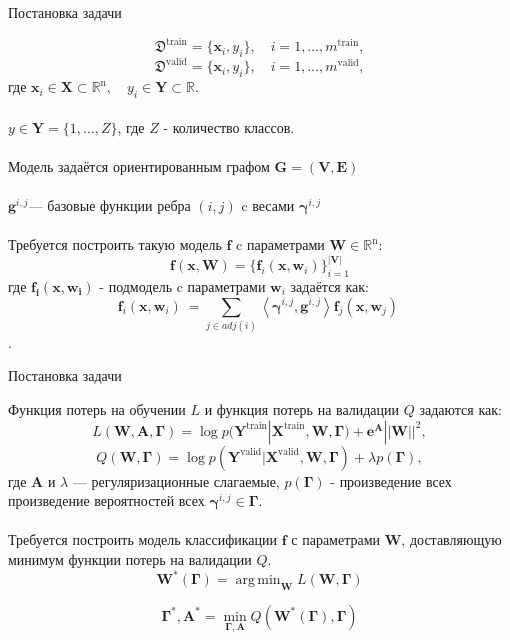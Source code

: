 \documentclass[10pt]{beamer}
\DeclareMathOperator*{\argmin}{arg\,min}
\begin{document}
\begin{frame}{Постановка задачи}

\[
\mathfrak{D}^{\text{train}} = \{\mathbf{x}_i, y_i\}, \quad i=1,\dots,m^{\text{train}},
\]
\[
\mathfrak{D}^{\text{valid}} = \{\mathbf{x}_i, y_i\}, \quad i=1,\dots,m^{\text{valid}},
\]
 где $\mathbf{x}_i\in\mathbf{X}\subset\mathbb{R}^{\text{n}},\quad y_i\in\mathbf{Y}\subset\mathbb{R}.$\\
~\\
$y\in\mathbf{Y}= \{1,\dots,Z\}$, где $Z$ - количество классов.\\
~\\
Модель задаётся ориентированным графом $\mathbf{G=(V,E)}$\\
~\\
$\mathbf{g}^{i,j} $--- базовые функции ребра $(i, j) $ c весами $\boldsymbol{\gamma}^{i,j}$\\
~\\
Требуется построить такую модель $\mathbf{f}$ c параметрами $\mathbf{W}\in\mathbb{R}^\text{n}$:
\[
\mathbf{f}(\mathbf{x}, \mathbf{W})= \{ \mathbf{f}_i(\mathbf{x}, \mathbf{w}_i)\}_{i=1}^\mathbf{|V|}
\]
где $\mathbf{f_i(x, w_i)}$ - подмодель c параметрами $\mathbf{w}_i$ задаётся как:
\[
\mathbf{f}_i(\mathbf{x}, \mathbf{w}_i)\ = \sum_{j\in adj(i)} \left\langle {\boldsymbol{\gamma}^{i,j}, \mathbf{g}^{i,j}} \right\rangle \mathbf{f}_j(\mathbf{x}, \mathbf{w}_j)\
\].


\end{frame}


\begin{frame}{Постановка задачи}

Функция потерь на обучении $L$ и функция потерь на валидации $Q$ задаются как:
\[
L (\mathbf{W}, \mathbf{A}, \boldsymbol{\Gamma})= \log p(\mathbf{Y}^\text{train}|\mathbf{X}^\text{train}, \mathbf{W}, \boldsymbol{\Gamma}) + \boldsymbol{e}^{\mathbf{A}}||\mathbf{W}||^2,
\]
\[
Q (\mathbf{W}, \boldsymbol{\Gamma})= \log p(\mathbf{Y}^\text{valid}|\mathbf{X}^\text{valid}, \mathbf{W}, \boldsymbol{\Gamma}) + \lambda p(\boldsymbol{\Gamma}),
\]
где $\mathbf{A}$ и $\lambda$ --- регуляризационные слагаемые, $p(\boldsymbol{\Gamma})$ - произведение всех произведение вероятностей всех $\boldsymbol{\gamma}^{i,j} \in \boldsymbol{\Gamma}$. \\
~\\
Требуется построить модель классификации $\mathbf{f}$ с параметрами $\mathbf{W}$, доставляющую минимум функции потерь на валидации $Q$.
\[
\mathbf{W}^*( \boldsymbol{\Gamma}) = \argmin_{\mathbf{W}}
L (\mathbf{W}, \boldsymbol{\Gamma})\]

\[
\boldsymbol{\Gamma}^*, \mathbf{A}^* = \min_{\boldsymbol{\Gamma}, \mathbf{A}} Q (\mathbf{W}^*( \boldsymbol{\Gamma}), \boldsymbol{\Gamma})
\]



\end{frame}
\end{document}
